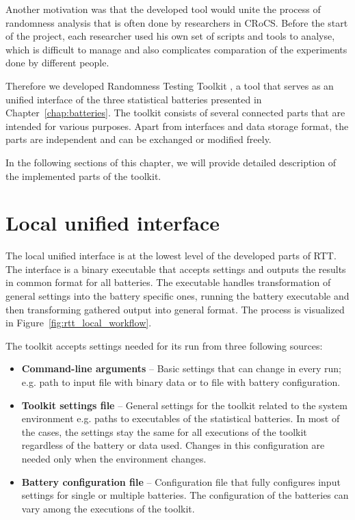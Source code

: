 \documentclass[
  digital,  	%
  color,		%
  oneside,   	%
  12pt,
  nocover,
  notable,
  nolof,
  nolot,
]{fithesis3}
\theoremstyle{definition}
\theoremstyle{remark}
\begin{document}
Another motivation was that the developed tool would unite the process of randomness analysis that is often done by researchers in CRoCS. Before the start of the project, each researcher used his own set of scripts and tools to analyse, which is difficult to manage and also complicates comparation of the experiments done by different people.

Therefore we developed Randomness Testing Toolkit \cite{rtt-github}, a tool that serves as an unified interface of the three statistical batteries presented in Chapter~\ref{chap:batteries}. The toolkit consists of several connected parts that are intended for various purposes. Apart from interfaces and data storage format, the parts are independent and can be exchanged or modified freely.

In the following sections of this chapter, we will provide detailed description of the implemented parts of the toolkit.

\section{Local unified interface}
The local unified interface is at the lowest level of the developed parts of RTT. The interface is a binary executable that accepts settings and outputs the results in common format for all batteries. The executable handles transformation of general settings into the battery specific ones, running the battery executable and then transforming gathered output into general format. The process is visualized in Figure~\ref{fig:rtt_local_workflow}.

The toolkit accepts settings needed for its run from three following sources:
\begin{itemize}
\item \textbf{Command-line arguments} -- Basic settings that can change in every run; e.g. path to input file with binary data or to file with battery configuration.
\item \textbf{Toolkit settings file} -- General settings for the toolkit related to the system environment e.g. paths to executables of the statistical batteries. In most of the cases, the settings stay the same for all executions of the toolkit regardless of the battery or data used. Changes in this configuration are needed only when the environment changes.
\item \textbf{Battery configuration file} -- Configuration file that fully configures input settings for single or multiple batteries. The configuration of the batteries can vary among the executions of the toolkit.
\end{itemize}
\end{document}

